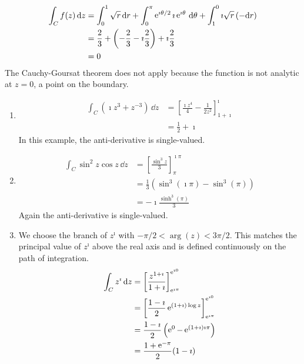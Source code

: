 {\begin{Solution}
  \label{solution parametric evaluation sqrt z}
  \begin{align*}
    \int_C f(z) \,\mathrm{d} z
    &= \int_0^1 \sqrt{r}\,\mathrm{d} r + \int_0^\pi \mathop{\mathrm{e}}\nolimits^{\imath \theta/2}  \imath \mathop{\mathrm{e}}\nolimits^{\imath \theta}\,\mathrm{d} \theta + \int_1^0 \imath \sqrt{r}
    \,(-\mathrm{d} r)
    \\
    &= \frac{2}{3} + \left( - \frac{2}{3} - \imath \frac{2}{3} \right)
    + \imath \frac{2}{3}
    \\
    &= 0
  \end{align*}
  The Cauchy-Goursat theorem does not apply because the function is not 
  analytic at $z = 0$, a point on the boundary.
\end{Solution}







\begin{Solution}
  \label{solution anti derivatives iz3 z-3}
  \begin{enumerate}
  \item 
    \begin{align*}
      \int_C \left( \imath z^3 + z^{-3} \right)\,\dd z
      &= \left[ \frac{\imath z^4}{4} - \frac{1}{2 z^2} \right]_{1+\imath}^\imath
      \\
      &= \frac{1}{2} + \imath
    \end{align*}
    In this example, the anti-derivative is single-valued.
  \item 
    \begin{align*}
      \int_C \sin^2 z \cos z \,\dd z
      &= \left[ \frac{\sin^3 z}{3} \right]_{\pi}^{\imath \pi}
      \\
      &= \frac{1}{3} \left( \sin^3(\imath \pi) - \sin^3(\pi) \right)
      \\
      &= - \imath \frac{\sinh^3(\pi)}{3}
    \end{align*}
    Again the anti-derivative is single-valued.
  \item 
    We choose the branch of $z^\imath$ with $-\pi/2 < \arg(z) < 3 \pi/2$.  This matches 
    the principal value of $z^\imath$ above the real axis and is defined 
    continuously on the path of integration.
    \begin{align*}
      \int_C z^\imath \,\mathrm{d} z 
      &= \left[ \frac{z^{1 + \imath}}{1 + \imath} \right]_{\mathop{\mathrm{e}}\nolimits^{\imath \pi}}^{\mathop{\mathrm{e}}\nolimits^{\imath 0}}
      \\
      &= \left[ \frac{1 - \imath}{2} \mathop{\mathrm{e}}\nolimits^{(1+\imath) \log z} \right]_{\mathop{\mathrm{e}}\nolimits^{\imath \pi}}^{\mathop{\mathrm{e}}\nolimits^{\imath 0}}
      \\
      &= \frac{1 - \imath}{2} \left( \mathop{\mathrm{e}}\nolimits^{0}  - \mathop{\mathrm{e}}\nolimits^{(1+\imath) \imath \pi} \right)
      \\
      &= \frac{1 + \mathop{\mathrm{e}}\nolimits^{-\pi}}{2}  (1 - \imath)
    \end{align*}
  \end{enumerate}  
\end{Solution}







\raggedbottom
}
